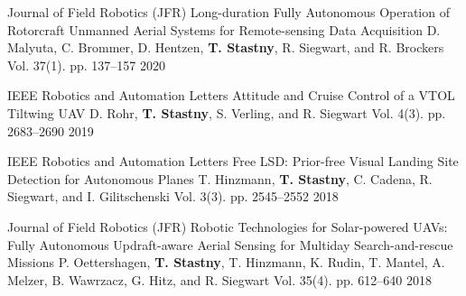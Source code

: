 

\begin{cventries}


\begin{flushleft}
\end{flushleft}

\cvpubentry
	{Journal of Field Robotics (JFR)} %
	{Long-duration Fully Autonomous Operation of Rotorcraft Unmanned Aerial Systems for Remote-sensing Data Acquisition} %
	{D. Malyuta, C. Brommer, D. Hentzen, \textbf{T. Stastny}, R. Siegwart, and R. Brockers} %
	{Vol. 37(1). pp. 137--157} %
	{2020} %
	{} %
	{} %

\cvpubentry
	{IEEE Robotics and Automation Letters} %
	{Attitude and Cruise Control of a VTOL Tiltwing UAV} %
	{D. Rohr, \textbf{T. Stastny}, S. Verling, and R. Siegwart} %
	{Vol. 4(3). pp. 2683--2690} %
	{2019} %
	{} %
	{} %

\cvpubentry
	{IEEE Robotics and Automation Letters} %
	{Free LSD: Prior-free Visual Landing Site Detection for Autonomous Planes} %
	{T. Hinzmann, \textbf{T. Stastny}, C. Cadena, R. Siegwart, and I. Gilitschenski} %
	{Vol. 3(3). pp. 2545--2552} %
	{2018} %
	{} %
	{} %
	
\cvpubentry
	{Journal of Field Robotics (JFR)} %
	{Robotic Technologies for Solar-powered UAVs: Fully Autonomous Updraft-aware Aerial Sensing for Multiday Search-and-rescue Missions} %
	{P. Oettershagen, \textbf{T. Stastny}, T. Hinzmann, K. Rudin, T. Mantel, A. Melzer, B. Wawrzacz, G. Hitz, and R. Siegwart} %
	{Vol. 35(4). pp. 612--640} %
	{2018} %
	{} %
	{} %


\end{cventries}

